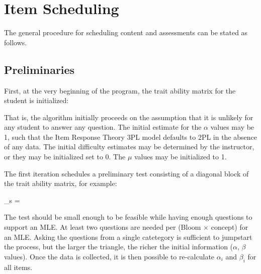 \section{Item Scheduling}
\label{sec:scheduler}

The general procedure for scheduling content and assessments can be stated as
follows.  

\subsection{Preliminaries}

First, at the very beginning of the program, the trait ability matrix
for the student is initialized:

\begin{equations}
  \Theta {}
\end{equations}

That is, the algorithm initially proceeds on the assumption that it is unlikely
for any student to answer any question.  The initial estimate for the $\alpha$
values may be 1, such that the Item Response Theory 3PL model defaults to 2PL
in the absence of any data.  The initial difficulty estimates may be determined
by the instructor, or they may be initialized set to 0.  The $\mu$ values may
be initialized to 1.

The first iteration schedules a preliminary test consisting of a diagonal block
of the trait ability matrix, for example:

\begin{equations}
\Theta_s =
\end{equations}

The test should be small enough to be feasible while having enough questions to
support an MLE.  At least two questions are needed per (Bloom $\times$ concept)
for an MLE.  Asking the questions from a single catetegory is sufficient to
jumpstart the process, but the larger the triangle, the richer the initial
information ($\alpha$, $\beta$ values).  Once the data is collected, it is then
possible to re-calculate $\alpha_i$ and $\beta_i$ for all items. 

